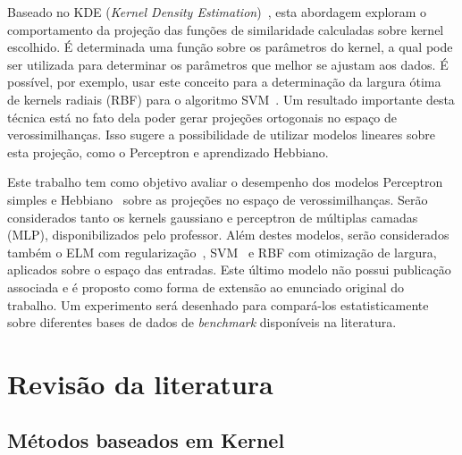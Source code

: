 \documentclass[conference]{IEEEtran}
\begin{document}
	Baseado no KDE (\textit{Kernel Density Estimation})~\cite{wang2013gaussian}, esta abordagem exploram o comportamento da projeção das funções de similaridade calculadas sobre kernel escolhido. É determinada uma função sobre os parâmetros do kernel, a qual pode ser utilizada para determinar os parâmetros que melhor se ajustam aos dados. É possível, por exemplo, usar este conceito para a determinação da largura ótima de kernels radiais (RBF) para o algoritmo SVM~\cite{menezes2019width}. Um resultado importante desta técnica está no fato dela poder gerar projeções ortogonais no espaço de verossimilhanças. Isso sugere a possibilidade de utilizar modelos lineares sobre esta projeção, como o Perceptron e aprendizado Hebbiano.
	
	Este trabalho tem como objetivo avaliar o desempenho dos modelos Perceptron simples \cite{rosenblatt1957perceptron} e Hebbiano~\cite{fernandez2011direct} sobre as projeções no espaço de verossimilhanças. Serão considerados tanto os kernels gaussiano e perceptron de múltiplas camadas (MLP), disponibilizados pelo professor. Além destes modelos, serão considerados também o ELM com regularização~\cite{huang2004extreme}, SVM~\cite{menezes2017otimizaccao, menezes2019width} e RBF com otimização de largura, aplicados sobre o espaço das entradas. Este último modelo não possui publicação associada e é proposto como forma de extensão ao enunciado original do trabalho. 
	Um experimento será desenhado para compará-los estatisticamente sobre diferentes bases de dados de \textit{benchmark} disponíveis na literatura. 
	

	\section{Revisão da literatura}

	\subsection{Métodos baseados em Kernel}
	
	
	
\end{document}
